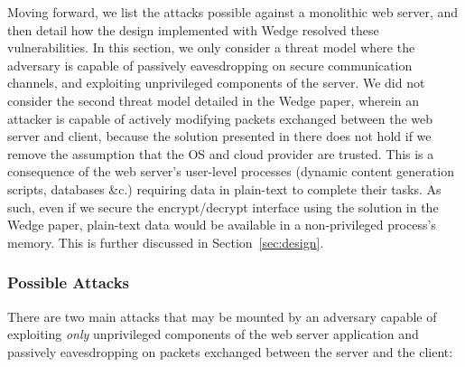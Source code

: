 \documentclass[../main.tex]{subfiles}
\begin{document}
Moving forward, we list the attacks possible against a monolithic web
server, and then detail how the design implemented with Wedge resolved
these vulnerabilities. In this section, we only consider a threat
model where the adversary is capable of passively eavesdropping on
secure communication channels, and exploiting unprivileged components
of the server. We did not consider the second threat model detailed in
the Wedge paper, wherein an attacker is capable of actively modifying
packets exchanged between the web server and client, because the
solution presented in there does not hold if we remove the assumption
that the OS and cloud provider are trusted. This is a consequence of
the web server's user-level processes (dynamic content generation
scripts, databases \&c.)  requiring data in plain-text to complete
their tasks. As such, even if we secure the encrypt/decrypt interface
using the solution in the Wedge paper, plain-text data would
be available in a non-privileged process's memory. This is further
discussed in Section~\ref{sec:design}.

\subsubsection*{Possible Attacks}

There are two main attacks that may be mounted by an adversary capable
of exploiting \textit{only} unprivileged components of the web
server application and passively eavesdropping on packets exchanged
between the server and the client:
 
\end{document}
